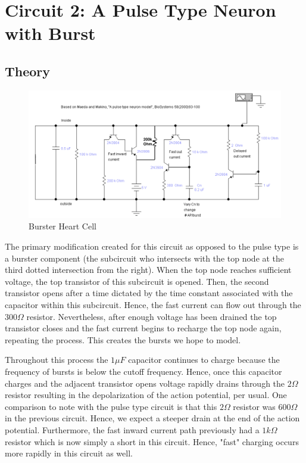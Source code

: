 \documentclass[12]{book}
\newcommand\0{\mathbf{0}}
\newcommand\<{\langle}
\renewcommand\>{\rangle}
\begin{document}
\section{Circuit 2: A Pulse Type Neuron with Burst}

\subsection{Theory}

\begin{figure}[H]
\centering
\includegraphics[width=\textwidth]{burster_heart_cell}	
\caption{Burster Heart Cell}
\end{figure}

The primary modification created for this circuit as opposed to the pulse type is a burster component (the subcircuit who intersects with the top node at the third dotted intersection from the right). When the top node reaches sufficient voltage, the top transistor of this subcircuit is opened. Then, the second transistor opens after a time dictated by the time constant associated with the capacitor within this subcircuit. Hence, the fast current can flow out through the $300 \Omega$ resistor. Nevertheless, after enough voltage has been drained the top transistor closes and the fast current begins to recharge the top node again, repeating the process. This creates the bursts we hope to model.

Throughout this process the $1 \mu F$ capacitor continues to charge because the frequency of bursts is below the cutoff frequency. Hence, once this capacitor charges and the adjacent transistor opens voltage rapidly drains through the $2 \Omega$ resistor resulting in the depolarization of the action potential, per usual. One comparison to note with the pulse type circuit is that this $2 \Omega$ resistor was $600 \Omega$ in the previous circuit. Hence, we expect a steeper drain at the end of the action potential. Furthermore, the fast inward current path previously had a $1k \Omega$ resistor which is now simply a short in this circuit. Hence, "fast" charging occurs more rapidly in this circuit as well.
\end{document}
